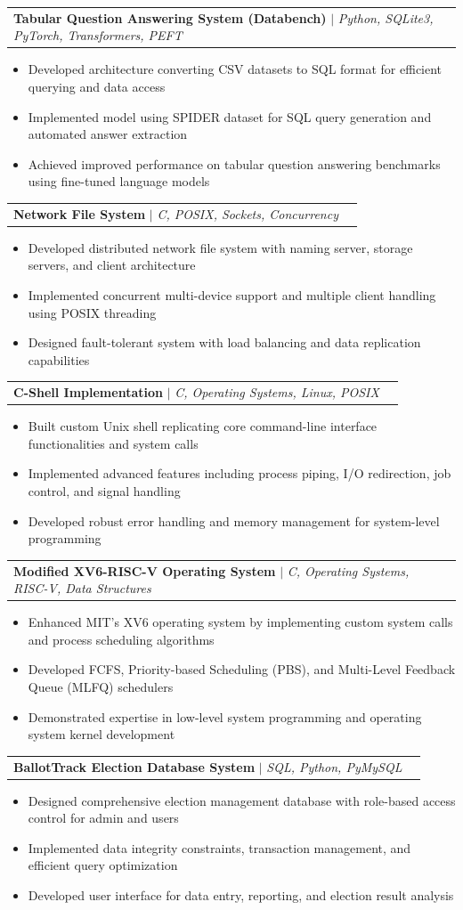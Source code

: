 \documentclass[letterpaper,11pt]{article}
\makeatletter
\newcommand{\resumeItem}[1]{
  \item\small{
    {#1 \vspace{-2pt}}
  }
}
\newcommand{\resumeProjectHeading}[2]{
    \item
    \begin{tabular*}{0.97\textwidth}{l@{\extracolsep{\fill}}r}
      \small#1 & #2 \\
    \end{tabular*}\vspace{-10pt}
}
\newcommand{\resumeItemListStart}{\begin{itemize}}
\newcommand{\resumeItemListEnd}{\end{itemize}\vspace{-5pt}}
\makeatother
\begin{document}
\resumeProjectHeading
{\textbf{Tabular Question Answering System (Databench)} $|$ \emph{Python, SQLite3, PyTorch, Transformers, PEFT}}{}
\resumeItemListStart
\resumeItem{Developed architecture converting CSV datasets to SQL format for efficient querying and data access}
\resumeItem{Implemented model using SPIDER dataset for SQL query generation and automated answer extraction}
\resumeItem{Achieved improved performance on tabular question answering benchmarks using fine-tuned language models}
\resumeItemListEnd

\resumeProjectHeading
{\textbf{Network File System} $|$ \emph{C, POSIX, Sockets, Concurrency}}{}
\resumeItemListStart
\resumeItem{Developed distributed network file system with naming server, storage servers, and client architecture}
\resumeItem{Implemented concurrent multi-device support and multiple client handling using POSIX threading}
\resumeItem{Designed fault-tolerant system with load balancing and data replication capabilities}
\resumeItemListEnd

\resumeProjectHeading
{\textbf{C-Shell Implementation} $|$ \emph{C, Operating Systems, Linux, POSIX}}{}
\resumeItemListStart
\resumeItem{Built custom Unix shell replicating core command-line interface functionalities and system calls}
\resumeItem{Implemented advanced features including process piping, I/O redirection, job control, and signal handling}
\resumeItem{Developed robust error handling and memory management for system-level programming}
\resumeItemListEnd

\resumeProjectHeading
{\textbf{Modified XV6-RISC-V Operating System} $|$ \emph{C, Operating Systems, RISC-V, Data Structures}}{}
\resumeItemListStart
\resumeItem{Enhanced MIT's XV6 operating system by implementing custom system calls and process scheduling algorithms}
\resumeItem{Developed FCFS, Priority-based Scheduling (PBS), and Multi-Level Feedback Queue (MLFQ) schedulers}
\resumeItem{Demonstrated expertise in low-level system programming and operating system kernel development}
\resumeItemListEnd

\resumeProjectHeading
{\textbf{BallotTrack Election Database System} $|$ \emph{SQL, Python, PyMySQL}}{}
\resumeItemListStart
\resumeItem{Designed comprehensive election management database with role-based access control for admin and users}
\resumeItem{Implemented data integrity constraints, transaction management, and efficient query optimization}
\resumeItem{Developed user interface for data entry, reporting, and election result analysis}
\resumeItemListEnd
\end{document}
